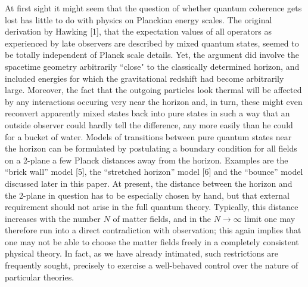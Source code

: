 At first sight it might seem that the question of whether quantum
coherence gets lost has little to do with physics on Planckian energy
scales. The original derivation by Hawking [1], that the expectation
values of all operators as experienced by late observers are described
by mixed quantum states, seemed to be totally independent of Planck
scale details. Yet, the argument did involve the spacetime geometry
arbitrarily ``close" to the classically determined horizon, and
included energies for which the gravitational redshift had become
arbitrarily large. Moreover, the fact that the outgoing particles look
thermal will be affected by any interactions occuring very near
the horizon and, in turn, these might even reconvert apparently mixed
states back into pure states in such a way that an outside observer
could hardly tell the difference, any more easily than he could for a
bucket of water. Models of transitions between pure quantum states near
the horizon can be formulated by postulating a boundary condition for
all fields on a 2-plane a few Planck distances away from the horizon.
Examples are the ``brick wall'' model [5], the ``stretched horizon''
model [6] and the ``bounce'' model discussed later in this paper. At
present, the distance between the horizon and the 2-plane in question
has to be especially chosen by hand, but that external requirement
should not arise in the full quantum theory. Typically, this distance
increases with the number $N$ of matter fields, and in the
$N\rightarrow\infty$ limit one may therefore run into a direct
contradiction with observation; this again implies that one may not be
able to choose the matter fields freely in a completely consistent
physical theory.  In fact, as we have already intimated, such
restrictions are frequently sought, precisely to exercise a
well-behaved control over the nature of particular theories.

